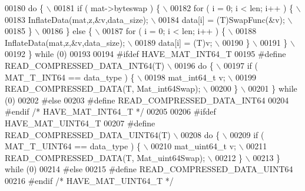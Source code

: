 \begin{DoxyCode}
00180 \textcolor{preprocessor}{    do \{ \(\backslash\)}
00181 \textcolor{preprocessor}{        if ( mat->byteswap ) \{ \(\backslash\)}
00182 \textcolor{preprocessor}{            for ( i = 0; i < len; i++ ) \{ \(\backslash\)}
00183 \textcolor{preprocessor}{                InflateData(mat,z,&v,data\_size); \(\backslash\)}
00184 \textcolor{preprocessor}{                data[i] = (T)SwapFunc(&v); \(\backslash\)}
00185 \textcolor{preprocessor}{            \} \(\backslash\)}
00186 \textcolor{preprocessor}{        \} else \{ \(\backslash\)}
00187 \textcolor{preprocessor}{            for ( i = 0; i < len; i++ ) \{ \(\backslash\)}
00188 \textcolor{preprocessor}{                InflateData(mat,z,&v,data\_size); \(\backslash\)}
00189 \textcolor{preprocessor}{                data[i] = (T)v; \(\backslash\)}
00190 \textcolor{preprocessor}{            \} \(\backslash\)}
00191 \textcolor{preprocessor}{        \} \(\backslash\)}
00192 \textcolor{preprocessor}{    \} while (0)}
00193 
00194 \textcolor{preprocessor}{#ifdef HAVE\_MAT\_INT64\_T}
00195 \textcolor{preprocessor}{#define READ\_COMPRESSED\_DATA\_INT64(T) \(\backslash\)}
00196 \textcolor{preprocessor}{    do \{ \(\backslash\)}
00197 \textcolor{preprocessor}{        if ( MAT\_T\_INT64 == data\_type ) \{ \(\backslash\)}
00198 \textcolor{preprocessor}{            mat\_int64\_t v; \(\backslash\)}
00199 \textcolor{preprocessor}{            READ\_COMPRESSED\_DATA(T, Mat\_int64Swap); \(\backslash\)}
00200 \textcolor{preprocessor}{        \} \(\backslash\)}
00201 \textcolor{preprocessor}{    \} while (0)}
00202 \textcolor{preprocessor}{#else}
00203 \textcolor{preprocessor}{#define READ\_COMPRESSED\_DATA\_INT64}
00204 \textcolor{preprocessor}{#endif }\textcolor{comment}{/* HAVE\_MAT\_INT64\_T */}\textcolor{preprocessor}{}
00205 
00206 \textcolor{preprocessor}{#ifdef HAVE\_MAT\_UINT64\_T}
00207 \textcolor{preprocessor}{#define READ\_COMPRESSED\_DATA\_UINT64(T) \(\backslash\)}
00208 \textcolor{preprocessor}{    do \{ \(\backslash\)}
00209 \textcolor{preprocessor}{        if ( MAT\_T\_UINT64 == data\_type ) \{ \(\backslash\)}
00210 \textcolor{preprocessor}{            mat\_uint64\_t v; \(\backslash\)}
00211 \textcolor{preprocessor}{            READ\_COMPRESSED\_DATA(T, Mat\_uint64Swap); \(\backslash\)}
00212 \textcolor{preprocessor}{        \} \(\backslash\)}
00213 \textcolor{preprocessor}{    \} while (0)}
00214 \textcolor{preprocessor}{#else}
00215 \textcolor{preprocessor}{#define READ\_COMPRESSED\_DATA\_UINT64}
00216 \textcolor{preprocessor}{#endif }\textcolor{comment}{/* HAVE\_MAT\_UINT64\_T */}\textcolor{preprocessor}{}

\end{DoxyCode}
